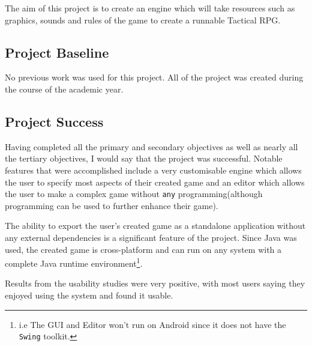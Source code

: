 The aim of this project is to create an engine which will take resources such as graphics, sounds and rules of the game to create a runnable Tactical RPG.

\subsection{Project Baseline}
\label{sub:baseline}

No previous work was used for this project. All of the project was created during the course of the academic year.

\subsection{Project Success}

Having completed all the primary and secondary objectives as well as nearly all the tertiary objectives, I would say that the project was successful.  Notable features that were accomplished include a very customisable engine which allows the user to specify most aspects of their created game and an editor which allows the user to make a complex game without \texttt{any} programming(although programming can be used to further enhance their game). 

The ability to export the user's created game as a standalone application without any external dependencies is a significant feature of the project. Since Java was used, the created game is cross-platform and can run on any system with  a complete Java runtime environment\footnote{i.e The GUI and Editor won't run on Android since it does not have the \texttt{Swing} toolkit.}.  

Results from the usability studies were very positive, with most users saying they enjoyed using the system and found it usable. 
